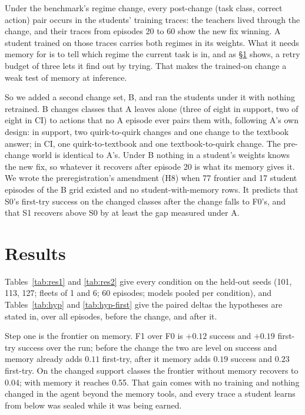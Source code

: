 \documentclass[11pt]{article}
\newcommand{\cond}[1]{\textsf{#1}}
\begin{document}
Under the benchmark's regime change, every post-change (task class, correct action) pair occurs in the students' training traces: the teachers lived through the change, and their traces from episodes 20 to 60 show the new fix winning. A student trained on those traces carries both regimes in its weights. What it needs memory for is to tell which regime the current task is in, and as \S\ref{sec:results} shows, a retry budget of three lets it find out by trying. That makes the trained-on change a weak test of memory at inference.

So we added a second change set, B, and ran the students under it with nothing retrained. B changes classes that A leaves alone (three of eight in support, two of eight in CI) to actions that no A episode ever pairs them with, following A's own design: in support, two quirk-to-quirk changes and one change to the textbook answer; in CI, one quirk-to-textbook and one textbook-to-quirk change. The pre-change world is identical to A's. Under B nothing in a student's weights knows the new fix, so whatever it recovers after episode 20 is what its memory gives it. We wrote the preregistration's amendment (H8) when 77 frontier and 17 student episodes of the B grid existed and no student-with-memory rows. It predicts that \cond{S0}'s first-try success on the changed classes after the change falls to \cond{F0}'s, and that \cond{S1} recovers above \cond{S0} by at least the gap measured under A.

\section{Results}
\label{sec:results}

Tables~\ref{tab:res1} and \ref{tab:res2} give every condition on the
held-out seeds (101, 113, 127; fleets of 1 and 6; 60 episodes; models pooled per condition),
and Tables~\ref{tab:hyp} and \ref{tab:hyp-first} give the paired deltas the
hypotheses are stated in, over all episodes, before the change, and after it.

Step one is the frontier on memory. \cond{F1} over \cond{F0} is $+0.12$ success and $+0.19$
first-try success over the run; before the change the two are level on success and memory
already adds $0.11$ first-try, after it memory adds $0.19$ success and $0.23$ first-try. On
the changed support classes the frontier without memory recovers to 0.04; with memory it
reaches 0.55. That gain comes with no training and nothing changed in the agent beyond the
memory tools, and every trace a student learns from below was sealed while it was being
earned.
\end{document}
